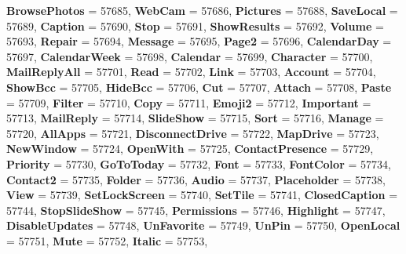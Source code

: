 \begin{DoxyCompactItemize}
\newline
{\bfseries Browse\+Photos} = 57685, 
{\bfseries Web\+Cam} = 57686, 
{\bfseries Pictures} = 57688, 
{\bfseries Save\+Local} = 57689, 
\newline
{\bfseries Caption} = 57690, 
{\bfseries Stop} = 57691, 
{\bfseries Show\+Results} = 57692, 
{\bfseries Volume} = 57693, 
\newline
{\bfseries Repair} = 57694, 
{\bfseries Message} = 57695, 
{\bfseries Page2} = 57696, 
{\bfseries Calendar\+Day} = 57697, 
\newline
{\bfseries Calendar\+Week} = 57698, 
{\bfseries Calendar} = 57699, 
{\bfseries Character} = 57700, 
{\bfseries Mail\+Reply\+All} = 57701, 
\newline
{\bfseries Read} = 57702, 
{\bfseries Link} = 57703, 
{\bfseries Account} = 57704, 
{\bfseries Show\+Bcc} = 57705, 
\newline
{\bfseries Hide\+Bcc} = 57706, 
{\bfseries Cut} = 57707, 
{\bfseries Attach} = 57708, 
{\bfseries Paste} = 57709, 
\newline
{\bfseries Filter} = 57710, 
{\bfseries Copy} = 57711, 
{\bfseries Emoji2} = 57712, 
{\bfseries Important} = 57713, 
\newline
{\bfseries Mail\+Reply} = 57714, 
{\bfseries Slide\+Show} = 57715, 
{\bfseries Sort} = 57716, 
{\bfseries Manage} = 57720, 
\newline
{\bfseries All\+Apps} = 57721, 
{\bfseries Disconnect\+Drive} = 57722, 
{\bfseries Map\+Drive} = 57723, 
{\bfseries New\+Window} = 57724, 
\newline
{\bfseries Open\+With} = 57725, 
{\bfseries Contact\+Presence} = 57729, 
{\bfseries Priority} = 57730, 
{\bfseries Go\+To\+Today} = 57732, 
\newline
{\bfseries Font} = 57733, 
{\bfseries Font\+Color} = 57734, 
{\bfseries Contact2} = 57735, 
{\bfseries Folder} = 57736, 
\newline
{\bfseries Audio} = 57737, 
{\bfseries Placeholder} = 57738, 
{\bfseries View} = 57739, 
{\bfseries Set\+Lock\+Screen} = 57740, 
\newline
{\bfseries Set\+Tile} = 57741, 
{\bfseries Closed\+Caption} = 57744, 
{\bfseries Stop\+Slide\+Show} = 57745, 
{\bfseries Permissions} = 57746, 
\newline
{\bfseries Highlight} = 57747, 
{\bfseries Disable\+Updates} = 57748, 
{\bfseries Un\+Favorite} = 57749, 
{\bfseries Un\+Pin} = 57750, 
\newline
{\bfseries Open\+Local} = 57751, 
{\bfseries Mute} = 57752, 
{\bfseries Italic} = 57753, 

\end{DoxyCompactItemize}
